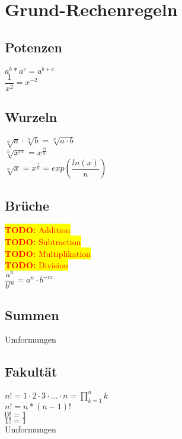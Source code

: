 \documentclass[10pt,a4paper]{article}
\newcommand{\todo}[1]{ \colorbox{yellow}{\textcolor{red}{\textbf{TODO:} {#1}}}\\ }
\begin{document}

\section{Grund-Rechenregeln}

\subsection{Potenzen}

$ a^{b} * a^{c} = a^{b+c} $\\
$ \dfrac{1}{x^2} = x^{-2}$

\subsection{Wurzeln}

$\sqrt[n]{a} \cdot \sqrt[n]{b} = \sqrt[n]{a \cdot b}  $ \\
$\sqrt[n]{x^{m}} = x^{\frac{m}{n}}  $ \\
$\sqrt[n]{x} = x^{\frac{1}{n}} = exp(\dfrac{ln(x)}{n})$

\subsection{Brüche}

\todo{Addition}
\todo{Subtraction}
\todo{Multiplikation}
\todo{Division}

$ \dfrac{a^{n}}{b^{m}} = a^{n} \cdot b^{-m}$

\subsection{Summen}

Umformungen


\subsection{Fakultät}

$ n! = 1\cdot 2\cdot 3\cdot \dots\cdot n =  \prod \limits_{k=1}^{n}k $\\
$ n! = n * (n-1)!$\\
$ 0! = 1 $\\
$ 1! = 1 $\\

Umformungen

\end{document}
